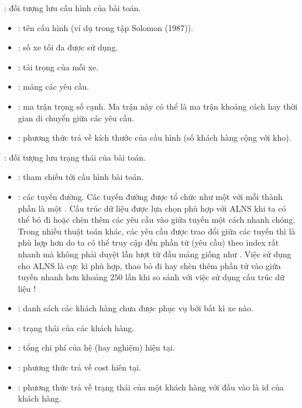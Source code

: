 : đối tượng lưu cấu hình của bài toán.
\begin{itemize}
  \item {}: tên cấu hình (ví dụ  trong tập Solomon (1987)).
  \item {}: số xe tối đa được sử dụng.
  \item {}: tải trọng của mỗi xe.
  \item {}: mảng các yêu cầu.
  \item {}: ma trận trọng số cạnh. Ma trận này có thể là ma trận khoảng cách hay thời gian di chuyển giữa các yêu cầu.
  \item {}: phương thức trả về kích thước của cấu hình (số khách hàng cộng với kho).
\end{itemize}

: đối tượng lưu trạng thái của bài toán.
\begin{itemize}
  \item {}: tham chiếu tới cấu hình bài toán.
  \item {}: các tuyến đường. Các tuyến đường được tổ chức như một  với mỗi thành phần là một . Cấu trúc dữ liệu  được lựa chọn phù hợp với ALNS khi ta có thể  bỏ đi hoặc chèn thêm các yêu cầu vào giữa tuyến một cách nhanh chóng. Trong nhiều thuật toán khác, các yêu cầu được trao đổi giữa các tuyến thì  là phù hợp hơn do ta có thể truy cập đến phần từ (yêu cầu) theo index rất nhanh mà không phải duyệt lần lượt từ đầu mảng giống như . Việc sử dụng  cho ALNS là cực kì phù hợp, thao bỏ đi hay chèn thêm phần tử vào giữa tuyến nhanh hơn khoảng $250$ lần khi so sánh với việc sử dụng cấu trúc dữ liệu !
  \item {}: danh sách các khách hàng chưa được phục vụ bởi bất kì xe nào.
  \item {}: trạng thái của các khách hàng.
  \item {}: tổng chi phí của hệ (hay nghiệm) hiện tại.
  \item {}: phương thức trả về cost hiên tại.
  \item {}: phương thức trả về trạng thái của một khách hàng với đầu vào là id của khách hàng.
\end{itemize}